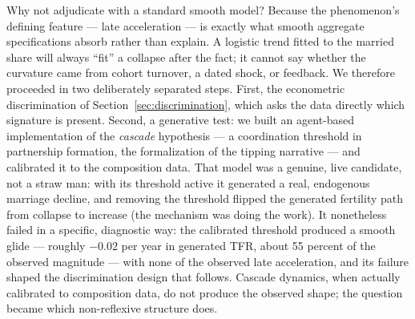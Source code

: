 Why not adjudicate with a standard smooth model? Because the phenomenon's
defining feature --- late acceleration --- is exactly what smooth aggregate
specifications absorb rather than explain. A logistic trend fitted to the
married share will always ``fit'' a collapse after the fact; it cannot say
whether the curvature came from cohort turnover, a dated shock, or feedback.
We therefore proceeded in two deliberately separated steps. First, the
econometric discrimination of Section~\ref{sec:discrimination}, which asks the
data directly which signature is present. Second, a generative test: we built
an agent-based implementation of the \emph{cascade} hypothesis --- a
coordination threshold in partnership formation, the formalization of the
tipping narrative --- and calibrated it to the composition data. That model was
a genuine, live candidate, not a straw man: with its threshold active it
generated a real, endogenous marriage decline, and removing the threshold
flipped the generated fertility path from collapse to increase (the mechanism
was doing the work). It nonetheless failed in a specific, diagnostic way: the
calibrated threshold produced a smooth glide --- roughly $-0.02$ per year in
generated TFR, about 55 percent of the observed magnitude --- with none of the
observed late acceleration, and its failure shaped the discrimination design
that follows. Cascade dynamics, when actually calibrated to composition data,
do not produce the observed shape; the question became which non-reflexive
structure does.
